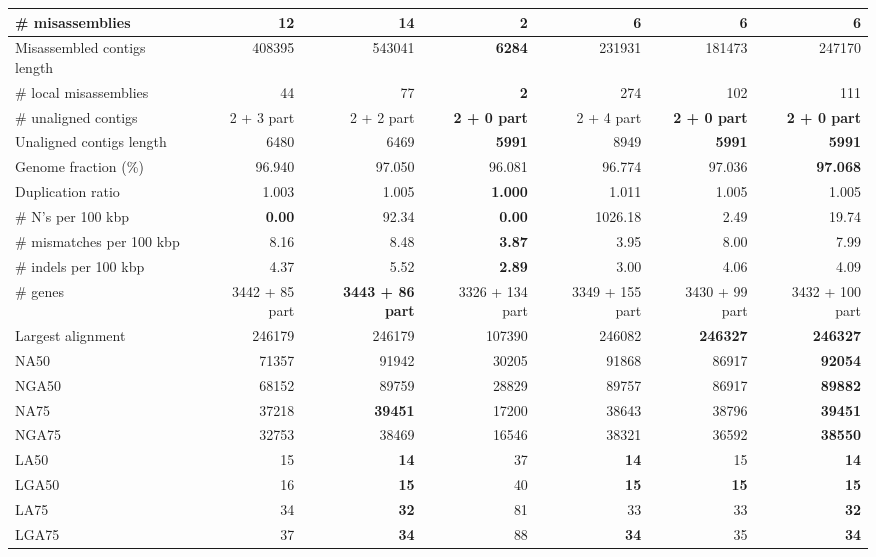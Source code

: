 \documentclass[12pt,a4paper]{article}
\begin{document}
\begin{table}[ht]
\begin{center}
\begin{tabular}{|l*{6}{|r}|}
\# misassemblies & 12 & 14 & {\bf 2} & 6 & 6 & 6 \\ \hline
Misassembled contigs length & 408395 & 543041 & {\bf 6284} & 231931 & 181473 & 247170 \\ \hline
\# local misassemblies & 44 & 77 & {\bf 2} & 274 & 102 & 111 \\ \hline
\# unaligned contigs & 2 + 3 part & 2 + 2 part & {\bf 2 + 0 part} & 2 + 4 part & {\bf 2 + 0 part} & {\bf 2 + 0 part} \\ \hline
Unaligned contigs length & 6480 & 6469 & {\bf 5991} & 8949 & {\bf 5991} & {\bf 5991} \\ \hline
Genome fraction (\%) & 96.940 & 97.050 & 96.081 & 96.774 & 97.036 & {\bf 97.068} \\ \hline
Duplication ratio & 1.003 & 1.005 & {\bf 1.000} & 1.011 & 1.005 & 1.005 \\ \hline
\# N's per 100 kbp & {\bf 0.00} & 92.34 & {\bf 0.00} & 1026.18 & 2.49 & 19.74 \\ \hline
\# mismatches per 100 kbp & 8.16 & 8.48 & {\bf 3.87} & 3.95 & 8.00 & 7.99 \\ \hline
\# indels per 100 kbp & 4.37 & 5.52 & {\bf 2.89} & 3.00 & 4.06 & 4.09 \\ \hline
\# genes & 3442 + 85 part & {\bf 3443 + 86 part} & 3326 + 134 part & 3349 + 155 part & 3430 + 99 part & 3432 + 100 part \\ \hline
Largest alignment & 246179 & 246179 & 107390 & 246082 & {\bf 246327} & {\bf 246327} \\ \hline
NA50 & 71357 & 91942 & 30205 & 91868 & 86917 & {\bf 92054} \\ \hline
NGA50 & 68152 & 89759 & 28829 & 89757 & 86917 & {\bf 89882} \\ \hline
NA75 & 37218 & {\bf 39451} & 17200 & 38643 & 38796 & {\bf 39451} \\ \hline
NGA75 & 32753 & 38469 & 16546 & 38321 & 36592 & {\bf 38550} \\ \hline
LA50 & 15 & {\bf 14} & 37 & {\bf 14} & 15 & {\bf 14} \\ \hline
LGA50 & 16 & {\bf 15} & 40 & {\bf 15} & {\bf 15} & {\bf 15} \\ \hline
LA75 & 34 & {\bf 32} & 81 & 33 & 33 & {\bf 32} \\ \hline
LGA75 & 37 & {\bf 34} & 88 & {\bf 34} & 35 & {\bf 34} \\ \hline
\end{tabular}
\end{center}
\end{table}
\end{document}
